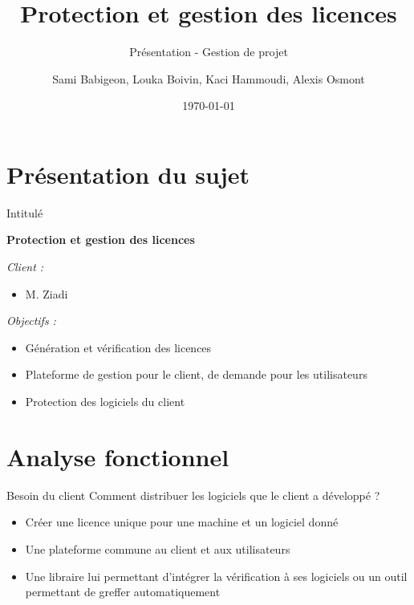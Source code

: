 \documentclass{cubeamer}
\title{Protection et gestion des licences}
\subtitle{Présentation - Gestion de projet}
\author{Sami Babigeon, Louka Boivin, Kaci Hammoudi, Alexis Osmont}
\date{\today}
\institute[Université de Rouen]{Master Informatique - 1ère année}
\begin{document}
\maketitle

\cutoc

%
%

\section{Présentation du sujet}

\begin{frame}{Intitulé}
    \centerline{\textbf{Protection et gestion des licences}}
    \medskip
    \emph{Client :}
    \begin{itemize}
        \item M. Ziadi
    \end{itemize}
    \emph{Objectifs :}
    \begin{itemize}
        \item Génération et vérification des licences
        \item Plateforme de gestion pour le client, de demande pour les utilisateurs
        \item Protection des logiciels du client
    \end{itemize}
\end{frame}

\section{Analyse fonctionnel}

\begin{frame}{Besoin du client}
    Comment distribuer les logiciels que le client a développé ?
    \begin{itemize}
        \item Créer une licence unique pour une machine et un logiciel donné
        \item Une plateforme commune au client et aux utilisateurs
        \item Une libraire lui permettant d'intégrer la vérification à ses logiciels ou
            un outil permettant de greffer automatiquement
    \end{itemize}
\end{frame}
\end{document}
